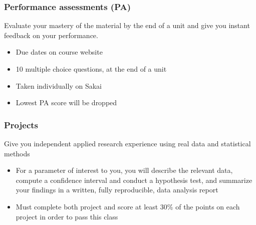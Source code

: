 \documentclass[slidestop,compress,mathserif,12pt,t,professionalfonts,xcolor=table]{beamer}
\begin{document}

\begin{frame}
\frametitle{Performance assessments (PA)}

 Evaluate your mastery of the material by the end of a unit and give you instant feedback on your performance.

\begin{itemize}

\item Due dates on course website

\item 10 multiple choice questions, at the end of a unit

\item Taken individually on Sakai

\item Lowest PA score will be dropped

\end{itemize}

\end{frame}


\begin{frame}
\frametitle{Projects}

 Give you independent applied research experience using real data and statistical methods

\begin{itemize}

\item For a parameter of interest to you, you will describe the relevant data, compute a confidence interval and conduct a hypothesis test, and summarize your findings in a written, fully reproducible, data analysis report

\item Must complete both project and score at least 30\% of the points on each project in order to pass this class

\end{itemize}

\end{frame}

\end{document}
